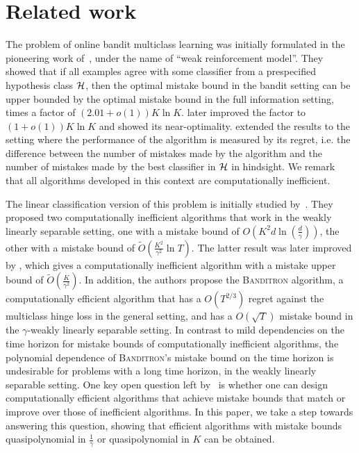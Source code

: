 \section{Related work}
\label{section:related-work}

The problem of online bandit multiclass learning was initially formulated in the
pioneering work of~\citet{Auer-Long-1999}, under the name of ``weak
reinforcement model''. They showed that if all examples agree with some
classifier from a prespecified hypothesis class $\mathcal{H}$, then the optimal
mistake bound in the bandit setting can be upper bounded by the optimal mistake
bound in the full information setting, times a factor of $(2.01 + o(1))K \ln K$.
\citet{Long-2017} later improved the factor to $(1 + o(1)) K \ln K$ and showed
its near-optimality. \citet{Daniely-Helbertal-2013} extended the results to the
setting where the performance of the algorithm is measured by its regret, i.e.
the difference between the number of mistakes made by the algorithm and the
number of mistakes made by the best classifier in $\mathcal{H}$ in hindsight.
We remark that
all algorithms developed in this context are computationally inefficient.

The linear classification version of this problem is initially studied
by~\citet{Kakade-Shalev-Shwartz-Tewari-2008}. They proposed two computationally
inefficient algorithms that work in the weakly linearly separable setting, one
with a mistake bound of $O(K^2 d \ln(\frac{d}{\gamma}))$, the other with a
mistake bound of $\widetilde{O}(\frac{K^2}{\gamma^2} \ln T)$. The latter result
was later improved by \citet{Daniely-Helbertal-2013}, which gives a
computationally inefficient algorithm with a mistake upper bound of
$\widetilde{O}(\frac{K}{\gamma^2})$. In addition, the authors propose the
\textsc{Banditron} algorithm, a computationally efficient algorithm that has a
$O(T^{2/3})$ regret against the multiclass hinge loss in the general setting,
and has a $O(\sqrt{T})$ mistake bound in the $\gamma$-weakly linearly separable
setting.
In contrast to mild dependencies on the time horizon for mistake bounds of
computationally inefficient algorithms,
the polynomial dependence of \textsc{Banditron}'s mistake bound on the
time horizon is undesirable for problems with a long time horizon, in the
weakly linearly separable setting. One key open
question left by~\citet{Kakade-Shalev-Shwartz-Tewari-2008} is whether one can
design computationally efficient algorithms that achieve mistake bounds that
match or improve over those of inefficient algorithms. In this paper, we take a
step towards answering this question, showing that efficient algorithms with
mistake bounds quasipolynomial in $\frac 1 \gamma$ or quasipolynomial in $K$ can
be obtained.

